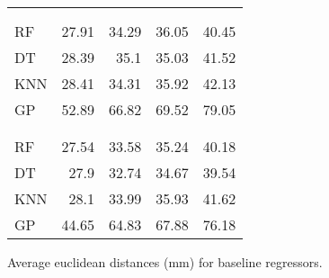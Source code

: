 \begin{margintable}
\begin{tabularx}{1\marginparwidth}{Xd{2.1}d{2.1}d{1.1}d{1.1}}
		&&    
		 &
		 &
		 \\
		\\
		\midrule
		RF & 27.91 & 34.29  & 36.05                      & 40.45 \\ 
		DT & 28.39                     & 35.1                       & 35.03  & 41.52 \\ 
		KNN& 28.41                     & 34.31                      & 35.92                      & 42.13 \\ 
		GP & 52.89                     & 66.82                      & 69.52                      & 79.05 \\ 
		\midrule
		&&    
		 &
		 &
		\\
		\\
		\midrule
		RF &27.54  & 33.58                       & 35.24                       & 40.18 \\ 
		DT &27.9                       & 32.74   & 34.67   & 39.54 \\ 
		KNN&28.1                       & 33.99                       & 35.93                       & 41.62 \\ 
		GP &44.65                      & 64.83                       & 67.88                       & 76.18 \\ 
		\bottomrule
	\end{tabularx}%
	\caption[Baseline data]{\small Average euclidean distances (mm) for baseline regressors.}
	\label{tab:baseline}
\end{margintable}

